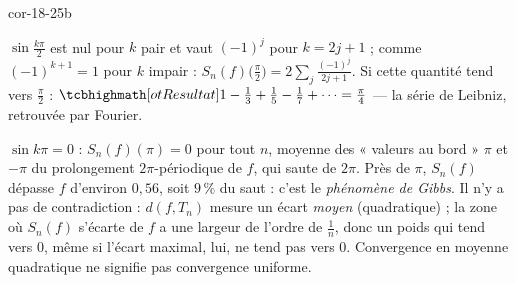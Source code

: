 \begin{blocLivre}{cor-18-25b}
\begin{corrigeSuite}
\begin{questions}[start=7]
  \item $\sin\frac{k\pi}2$ est nul pour $k$ pair et vaut $(-1)^{j}$ pour
    $k=2j+1$ ; comme $(-1)^{k+1}=1$ pour $k$ impair :
    $S_n(f)\bigl(\frac\pi2\bigr)=2\sum_j\frac{(-1)^{j}}{2j+1}$. Si cette
    quantité tend vers $\frac\pi2$ :
    $\res{1-\tfrac13+\tfrac15-\tfrac17+\cdots=\tfrac\pi4}$ — la série de
    Leibniz, retrouvée par Fourier.
  \item $\sin k\pi=0$ : $S_n(f)(\pi)=0$ pour tout $n$, moyenne des « valeurs
    au bord » $\pi$ et $-\pi$ du prolongement $2\pi$-périodique de $f$, qui
    saute de $2\pi$. Près de $\pi$, $S_n(f)$ dépasse $f$ d'environ
    $0{,}56$, soit $9\,\%$ du saut : c'est le \emph{phénomène de Gibbs}. Il
    n'y a pas de contradiction : $d(f,T_n)$ mesure un écart \emph{moyen}
    (quadratique) ; la zone où $S_n(f)$ s'écarte de $f$ a une largeur de
    l'ordre de $\frac1n$, donc un poids qui tend vers $0$, même si l'écart
    maximal, lui, ne tend pas vers $0$. Convergence en moyenne
    quadratique ne signifie pas convergence uniforme.
\end{questions}
\end{corrigeSuite}
\end{blocLivre}
